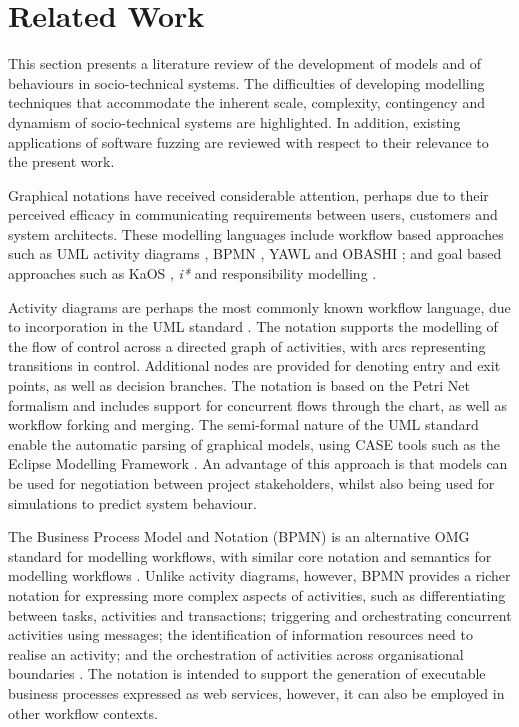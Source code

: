 \documentclass{sig-alternate}
\begin{document}

\section{Related Work}

\label{sec:related}


This section presents a literature review of the development of models and of
behaviours in socio-technical systems.  The difficulties of developing modelling
techniques that accommodate the inherent scale, complexity, contingency and
dynamism of socio-technical systems are highlighted.  In addition, existing
applications of software fuzzing are reviewed with respect to their relevance to
the present work.

Graphical notations have received considerable attention, perhaps due to their
perceived efficacy in communicating requirements between users, customers and
system architects.  These modelling languages include workflow based approaches
such as UML activity diagrams \citep{omg2010omguml}, BPMN \citep{omg2011omgbpmn},
YAWL \citep{hofstede2010yawl} and OBASHI \cite{obashimethodology}; and goal
based approaches such as KaOS \citep{Werneck2009}, \emph{i*} \citep{yu1995} and
responsibility modelling \citep{sommerville09responsibility}.

Activity diagrams are perhaps the most commonly known workflow language, due to
incorporation in the UML standard \citep{omg2010omguml}.  The notation supports
the modelling of the flow of control across a directed graph of activities, with
arcs representing transitions in control.  Additional nodes are provided for
denoting entry and exit points, as well as decision branches.  The notation is
based on the Petri Net formalism and includes support for concurrent flows
through the chart, as well as workflow forking and merging. The semi-formal
nature of the UML standard enable the automatic parsing of graphical models,
using CASE tools such as the Eclipse Modelling Framework \citep{EMFManual}.  An
advantage of this approach is that models can be used for negotiation between
project stakeholders, whilst also being used for simulations to predict system
behaviour.

The Business Process Model and Notation (BPMN) is an alternative OMG standard
for modelling workflows, with similar core notation and semantics for modelling
workflows \citep{omg2011omgbpmn}.  Unlike activity diagrams, however, BPMN
provides a richer notation for expressing more complex aspects of activities,
such as differentiating between tasks, activities and transactions; triggering
and orchestrating concurrent activities using messages; the identification of
information resources need to realise an activity; and the orchestration of
activities across organisational boundaries \citep{White2004}.  The notation is
intended to support the generation of executable business processes expressed as
web services, however, it can also be employed in other workflow contexts.
\end{document}
